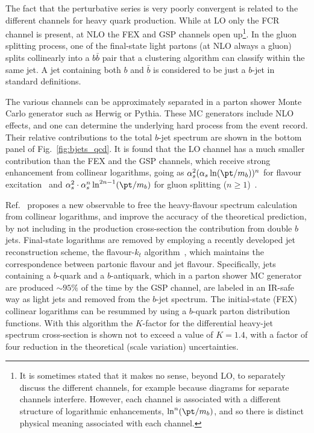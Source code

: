 The fact that the perturbative series is very poorly convergent is related to the different channels for heavy quark production. 
While at LO only the FCR channel is present, at NLO the FEX and GSP channels open up\footnote{It is sometimes stated that it makes no sense, beyond LO, to separately discuss the different channels, for example because diagrams for separate channels interfere. However, each channel is associated with a different structure of logarithmic enhancements, $\ln^n (\pt / m_b )$, and so there is distinct physical meaning associated with each channel.}.  %
 In the gluon splitting process, one of the final-state light partons (at NLO always a gluon) splits collinearly into a $b\bar{b}$ pair that a clustering algorithm can classify within the same jet. A jet containing both $b$ and $\bar{b}$ is considered to be just a $b$-jet in standard definitions.

The various channels can be approximately separated in a parton shower Monte Carlo generator such as {\sc Herwig} or {\sc Pythia}. These MC generators include NLO effects, and 
one can determine the underlying hard process from the event record.  Their relative contributions to the total $b$-jet spectrum are shown in the bottom panel of Fig.~\ref{fig:bjets_qcd}. It is found that the LO channel has a much smaller contribution than the FEX and the GSP channels, which
receive strong enhancement from collinear logarithms, %
going as $\alpha_s^2 (\alpha_s \ln( \pt / m_b))^n$ for flavour excitation~\cite{Altarelli1977298} 
and $\alpha_s^2 \cdot \alpha_s^n \ln^{2n-1}(\pt/m_b)$ for gluon splitting ($n\ge 1$)~\cite{Seymour1995163}.

Ref.~\cite{Salam.AccurateHQ} proposes a new observable to free the heavy-flavour spectrum calculation from collinear logarithms, and improve the accuracy of the theoretical prediction,
by not including in the production cross-section the contribution from double $b$ jets. Final-state logarithms are removed by employing a recently developed jet reconstruction scheme, the flavour-$k_t$ algorithm~\cite{flavorkt}, which maintains the correspondence between partonic flavour and jet flavour. Specifically, jets containing a $b$-quark and a $b$-antiquark, which in a parton shower MC generator are produced $\sim95\%$ of the time by the GSP channel, are labeled in an IR-safe way as light jets and removed from the $b$-jet spectrum.
The initial-state (FEX) collinear logarithms can be resummed by using a $b$-quark parton distribution functions.
With this algorithm the $K$-factor for the differential heavy-jet spectrum cross-section is shown not to exceed a value of $K=1.4$, with a factor of four reduction in the theoretical (scale variation) uncertainties.




